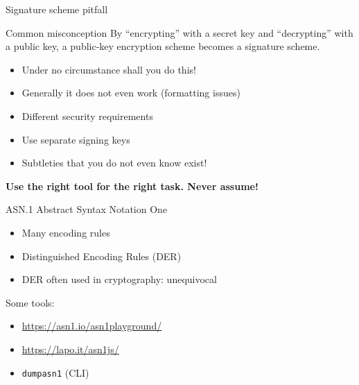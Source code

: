 \begin{frame}{Signature scheme pitfall}
  \pause
  \begin{block}{Common misconception}
    By \enquote{encrypting} with a secret key and \enquote{decrypting} with a public key, a public-key encryption scheme becomes a signature scheme.
  \end{block}

  \begin{itemize}[<+(1)->]
    \item Under no circumstance shall you do this!
    \item Generally it does not even work (formatting issues)
    \item Different security requirements
    \item Use separate signing keys
    \item Subtleties that you do not even know exist!
  \end{itemize}

  \pause
  \textbf{Use the right tool for the right task. Never assume!}
\end{frame}

\begin{frame}{ASN.1}
  Abstract Syntax Notation One
  \begin{itemize}[<+(1)->]
    \item Many encoding rules
    \item Distinguished Encoding Rules (DER)
    \item DER often used in cryptography: unequivocal
  \end{itemize}

  \pause
  Some tools:
  \begin{itemize}[<+(1)->]
    \item \url{https://asn1.io/asn1playground/}
    \item \url{https://lapo.it/asn1js/}
    \item \texttt{dumpasn1} (CLI)
  \end{itemize}
\end{frame}


